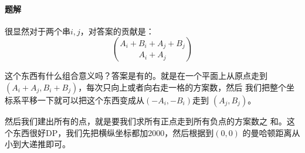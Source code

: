 \paragraph{题解}
很显然对于两个串$i, j$，对答案的贡献是：
\[\binom{A_i + B_i + A_j + B_j}{A_i + A_j}\]\par
这个东西有什么组合意义吗？答案是有的。就是在一个平面上从原点走到
$(A_i + A_j, B_i + B_j)$，每次只向上或者向右走一格的方案数，然后
我们把整个坐标系平移一下就可以把这个东西变成从$(-A_i, -B_i)$走到
$(A_j, B_j)$。\par
然后我们建出所有的点，就是要我们求所有正点走到所有负点的方案数之
和。这个东西很好DP，我们先把横纵坐标都加2000，然后根据到$(0, 0)$
的曼哈顿距离从小到大递推即可。